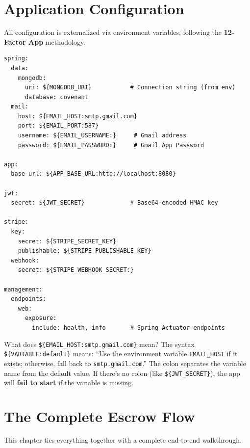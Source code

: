 \documentclass[11pt, a4paper]{article}
\begin{document}
\section{Application Configuration}

All configuration is externalized via environment variables, following the \textbf{12-Factor App} methodology.

\begin{lstlisting}[style=yamlstyle, caption={application.yaml}]
spring:
  data:
    mongodb:
      uri: ${MONGODB_URI}           # Connection string (from env)
      database: covenant
  mail:
    host: ${EMAIL_HOST:smtp.gmail.com}
    port: ${EMAIL_PORT:587}
    username: ${EMAIL_USERNAME:}     # Gmail address
    password: ${EMAIL_PASSWORD:}     # Gmail App Password

app:
  base-url: ${APP_BASE_URL:http://localhost:8080}

jwt:
  secret: ${JWT_SECRET}             # Base64-encoded HMAC key

stripe:
  key:
    secret: ${STRIPE_SECRET_KEY}
    publishable: ${STRIPE_PUBLISHABLE_KEY}
  webhook:
    secret: ${STRIPE_WEBHOOK_SECRET:}

management:
  endpoints:
    web:
      exposure:
        include: health, info       # Spring Actuator endpoints
\end{lstlisting}

\begin{interviewbox}{What does \texttt{\$\{EMAIL\_HOST:smtp.gmail.com\}} mean?}
The syntax \texttt{\$\{VARIABLE:default\}} means: ``Use the environment variable \texttt{EMAIL\_HOST} if it exists; otherwise, fall back to \texttt{smtp.gmail.com}.'' The colon separates the variable name from the default value. If there's no colon (like \texttt{\$\{JWT\_SECRET\}}), the app will \textbf{fail to start} if the variable is missing.
\end{interviewbox}


\section{The Complete Escrow Flow}

This chapter ties everything together with a complete end-to-end walkthrough.
\end{document}
